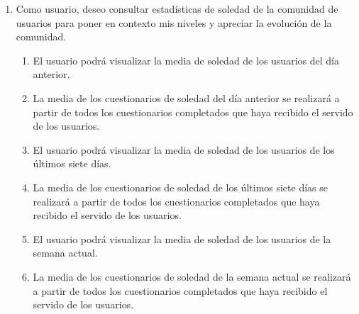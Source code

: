         \begin{enumerate}[resume=req-usuario,label=\textbf{\texttt{RU-\arabic*}}]
            \item Como usuario, deseo consultar estadísticas de soledad de la comunidad de usuarios para poner en contexto mis niveles y apreciar la evolución de la comunidad.
            \begin{enumerate}[resume=req-funcionales,label=\textbf{\texttt{RF-\arabic*}}]
                \item El usuario podrá visualizar la media de soledad de los usuarios del día anterior.
                \item La media de los cuestionarios de soledad del día anterior se realizará a partir de todos los cuestionarios completados que haya recibido el servido de los usuarios.
                \item El usuario podrá visualizar la media de soledad de los usuarios de los últimos siete días.
                \item La media de los cuestionarios de soledad de los últimos siete días se realizará a partir de todos los cuestionarios completados que haya recibido el servido de los usuarios.
                \item El usuario podrá visualizar la media de soledad de los usuarios de la semana actual.
                \item La media de los cuestionarios de soledad de la semana actual se realizará a partir de todos los cuestionarios completados que haya recibido el servido de los usuarios.
            \end{enumerate}
        \end{enumerate}
        
            

